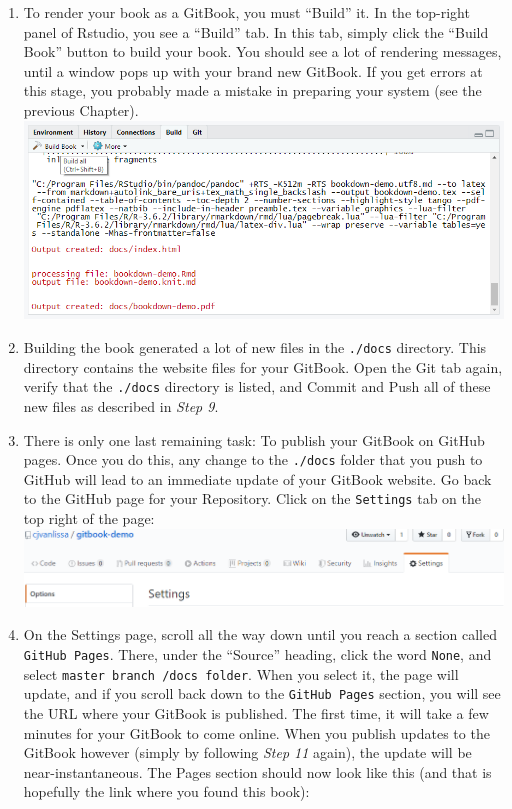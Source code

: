 \documentclass[
]{book}
\begin{document}
\begin{enumerate}
\item
  To render your book as a GitBook, you must ``Build'' it. In the top-right panel of Rstudio, you see a ``Build'' tab. In this tab, simply click the ``Build Book'' button to build your book. You should see a lot of rendering messages, until a window pops up with your brand new GitBook. If you get errors at this stage, you probably made a mistake in preparing your system (see the previous Chapter).\\
  \includegraphics{./img/build_book.png}
\item
  Building the book generated a lot of new files in the \texttt{./docs} directory. This directory contains the website files for your GitBook. Open the Git tab again, verify that the \texttt{./docs} directory is listed, and Commit and Push all of these new files as described in \emph{Step 9}.
\item
  There is only one last remaining task: To publish your GitBook on GitHub pages. Once you do this, any change to the \texttt{./docs} folder that you push to GitHub will lead to an immediate update of your GitBook website. Go back to the GitHub page for your Repository. Click on the \texttt{Settings} tab on the top right of the page:\\
  \includegraphics{./img/settings.png}
\item
  On the Settings page, scroll all the way down until you reach a section called \texttt{GitHub\ Pages}. There, under the ``Source'' heading, click the word \texttt{None}, and select \texttt{master\ branch\ /docs\ folder}. When you select it, the page will update, and if you scroll back down to the \texttt{GitHub\ Pages} section, you will see the URL where your GitBook is published. The first time, it will take a few minutes for your GitBook to come online. When you publish updates to the GitBook however (simply by following \emph{Step 11} again), the update will be near-instantaneous. The Pages section should now look like this (and that is hopefully the link where you found this book):\\

\end{enumerate}
\end{document}
